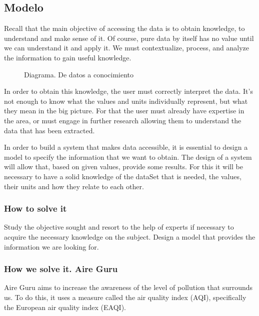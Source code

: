 \subsection{Modelo}

Recall that the main objective of accessing the data is to obtain knowledge, to understand and make sense of it. Of course, 
pure data by itself has no value until we can understand it and apply it. We must contextualize, process, and analyze the 
information to gain useful knowledge. \\
    
\begin{figure}[ht]
    \centering 
      \caption{Diagrama. De datos a conocimiento}
    \end{figure}
 
    In order to obtain this knowledge, the user must correctly interpret the data. It's not enough to know what the values and 
    units individually represent, but what they mean in the big picture. For that the user must already have expertise in the 
    area, or must engage in further research allowing them to understand the data that has been extracted.
     
    In order to build a system that makes data accessible, it is essential to design a model to specify the
    information that we want to obtain. The design of a system will allow that, based on given values, provide some results.
    For this it will be necessary to have a solid knowledge of the dataSet that is needed, the values,
    their units and how they relate to each other.


\subsubsection{How to solve it} 
Study the objective sought and resort to the help of experts if necessary to acquire the necessary knowledge
on the subject. Design a model that provides the information we are looking for.

\subsubsection{How we solve it. Aire Guru} 
Aire Guru aims to increase the awareness of the level of pollution that surrounds us. To do this, it uses a measure called
the air quality index (AQI), specifically the European air quality index (EAQI).


